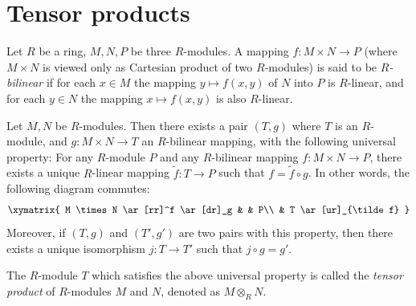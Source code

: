 \section{Tensor products}
\label{section-tensor-product}

\begin{definition}
\label{definition-bilinear}
Let $R$ be a ring, $M, N, P$ be three $R$-modules.
A mapping $f : M \times N \to P$ (where $M \times N$
is viewed only as Cartesian product of two $R$-modules) is said to be
{\it $R$-bilinear} if for each $x \in M$
the mapping $y\mapsto f(x, y)$ of $N$ into $P$ is $R$-linear, and for each
$y\in N$ the mapping $x\mapsto f(x, y)$ is also $R$-linear.
\end{definition}

\begin{lemma}
\label{lemma-tensor-product}
Let $M, N$ be $R$-modules. Then there exists a pair $(T, g)$
where $T$ is an $R$-module, and
$g : M \times N \to T$ an $R$-bilinear
mapping, with the following universal property:
For any $R$-module $P$ and any $R$-bilinear mapping
$f : M \times N \to P$, there
exists a unique $R$-linear
mapping $\tilde{f} : T \to P$ such that $f = \tilde{f} \circ g$.
In other words, the following diagram commutes:
$$
\xymatrix{
M \times N \ar[rr]^f \ar[dr]_g & & P\\
& T \ar[ur]_{\tilde f}
}
$$
Moreover, if $(T, g)$ and $(T', g')$
are two pairs with this property, then there
exists a unique isomorphism
$j : T \to T'$ such that $j\circ g = g'$.
\end{lemma}

\noindent
The $R$-module $T$ which satisfies the above universal property is called
the  {\it tensor product} of $R$-modules $M$ and $N$, denoted as
$M \otimes_R N$.

